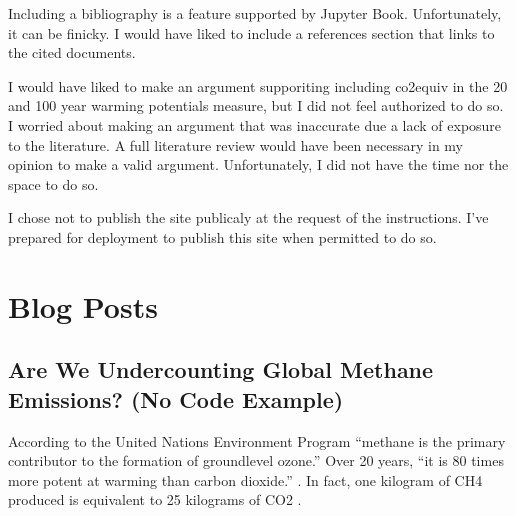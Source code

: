 \documentclass[letterpaper,10pt,english]{jupyterBook}
\begin{document}
\begin{DUlineblock}{0em}
\item[] 
\end{DUlineblock}

\sphinxAtStartPar
Including a bibliography is a feature supported by Jupyter Book.  Unfortunately, it can be finicky.  I would have liked to include a references section that links to the cited documents.

\begin{DUlineblock}{0em}
\item[] 
\end{DUlineblock}

\sphinxAtStartPar
I would have liked to make an argument supporiting including co2equiv in the 20 and 100 year warming potentials measure, but I did not feel authorized to do so.  I worried about making an argument that was inaccurate due a lack of exposure to the literature.   A full literature review would have been necessary in my opinion to make a valid argument.  Unfortunately, I did not have the time nor the space to do so.

\begin{DUlineblock}{0em}
\item[] 
\end{DUlineblock}

\sphinxAtStartPar
I chose not to publish the site publicaly at the request of the instructions.  I’ve prepared  for deployment to publish this site when permitted to do so.

\sphinxstepscope


\part{Blog Posts}

\sphinxstepscope


\chapter{Are We Undercounting Global Methane Emissions? (No Code Example)}
\label{\detokenize{notebooks/hidden_post:are-we-undercounting-global-methane-emissions-no-code-example}}\label{\detokenize{notebooks/hidden_post::doc}}
\sphinxAtStartPar
According to the United Nations Environment Program “methane is the primary contributor to the formation of ground\sphinxhyphen{}level ozone.” Over 20 years, “it is 80 times more potent at warming than carbon dioxide.” .  In fact, one kilogram of CH4 produced is equivalent to 25 kilograms of CO2 .
\end{document}
